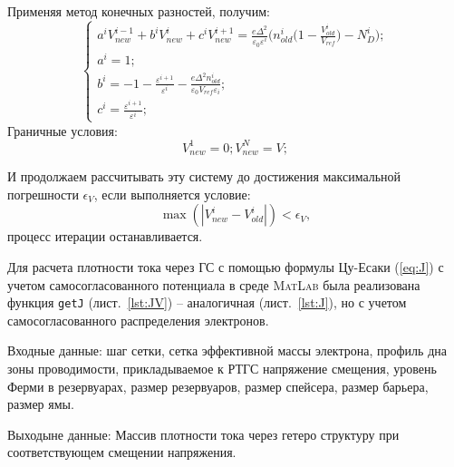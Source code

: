 Применяя метод конечных разностей, получим:
\begin{equation}
	\label{eq:VsFD}
	\begin{cases}
		a^{i}V_{new}^{i-1} + b^{i}V_{new}^{i} + c^{i}V^{i+1}_{new} = \frac{e\Delta^{2}}{\varepsilon_{0}\varepsilon^{i}}\bigg( n_{old}^{i}\bigg( 1 - \frac{V_{old}^{i}}{V_{ref}} \bigg) - N_{D}^{i} \bigg);\\
		a^{i} = 1;\\
		b^{i} = -1 - \frac{\varepsilon^{i+1}}{\varepsilon^{i}} -\frac{e\Delta^{2}n_{old}^{i}}{\varepsilon_{0} V_{ref}\varepsilon_{i}};\\
		c^{i} = \frac{\varepsilon^{i+1}}{\varepsilon^{i}};
	\end{cases}
\end{equation}
Граничные условия:
\begin{equation}
	\label{eq:VsFDB}
	V^{1}_{new} = 0;
	V^{N}_{new} = V;
\end{equation}

И продолжаем рассчитывать эту систему до достижения максимальной погрешности $\epsilon_{V}$, если выполняется условие:
\begin{equation}
	\label{eq:InterLim}
 	\max(|V_{new}^{i} - V_{old}^{i}|) < \epsilon_{V},
\end{equation} 
процесс итерации останавливается.

Для расчета плотности тока через ГС с помощью формулы Цу-Есаки (\ref{eq:J}) с учетом самосогласованного потенциала в среде \textsc{MatLab} была реализована функция \texttt{getJ} (лист.~\ref{lst:JV}) -- аналогичная (лист.~\ref{lst:J}), но с учетом самосогласованного распределения электронов.

Входные данные: шаг сетки, сетка эффективной массы электрона, профиль дна зоны проводимости, прикладываемое к РТГС напряжение смещения, уровень Ферми в резервуарах, размер резервуаров, размер спейсера, размер барьера, размер ямы.

Выходыне данные: Массив плотности тока через гетеро структуру при соответствующем смещении напряжения.

